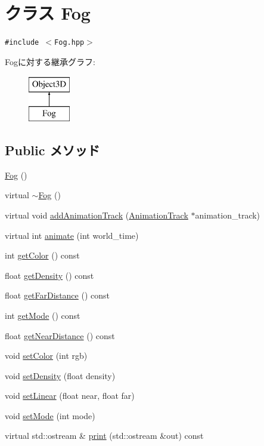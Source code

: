 \hypertarget{classm3g_1_1Fog}{
\section{クラス Fog}
\label{classm3g_1_1Fog}
}
{\tt \#include $<$Fog.hpp$>$}

Fogに対する継承グラフ:\begin{figure}[H]
\begin{center}
\leavevmode
\includegraphics[height=2cm]{classm3g_1_1Fog}
\end{center}
\end{figure}
\subsection*{Public メソッド}
\begin{CompactItemize}
\item 
\hyperlink{classm3g_1_1Fog_232ea9c5f5824d924fa185401fbfb234}{Fog} ()
\item 
virtual \hyperlink{classm3g_1_1Fog_c13d77e65284ed8f7480c8f83ed9780f}{$\sim$Fog} ()
\item 
virtual void \hyperlink{classm3g_1_1Fog_415c0b110f95410ded9b85e5d99a496b}{addAnimationTrack} (\hyperlink{classm3g_1_1AnimationTrack}{AnimationTrack} $\ast$animation\_\-track)
\item 
virtual int \hyperlink{classm3g_1_1Fog_8aad1ceab4c2a03609c8a42324ce484d}{animate} (int world\_\-time)
\item 
int \hyperlink{classm3g_1_1Fog_4cfa1931c265ec3412fe3f6408a1b4f5}{getColor} () const 
\item 
float \hyperlink{classm3g_1_1Fog_31deef556a6aa5e519d3c79bd9c383c0}{getDensity} () const 
\item 
float \hyperlink{classm3g_1_1Fog_90df17252a921929fce6a5e92aed4021}{getFarDistance} () const 
\item 
int \hyperlink{classm3g_1_1Fog_d4ce4524e4751fe5e3cfb8c270347d54}{getMode} () const 
\item 
float \hyperlink{classm3g_1_1Fog_cd7a642e43bf99b0e1c5c24d3c6424a2}{getNearDistance} () const 
\item 
void \hyperlink{classm3g_1_1Fog_b1f5cc0f5cc6bbbd716a526c61f1081d}{setColor} (int rgb)
\item 
void \hyperlink{classm3g_1_1Fog_0ceeda25e326e99d6e971e980a00bd49}{setDensity} (float density)
\item 
void \hyperlink{classm3g_1_1Fog_a46fd556865ae7f1c683c3741b68c168}{setLinear} (float near, float far)
\item 
void \hyperlink{classm3g_1_1Fog_9f407b18ba6235cb96fa95611c1ea3a4}{setMode} (int mode)
\item 
virtual std::ostream \& \hyperlink{classm3g_1_1Fog_6fea17fa1532df3794f8cb39cb4f911f}{print} (std::ostream \&out) const 
\end{CompactItemize}
